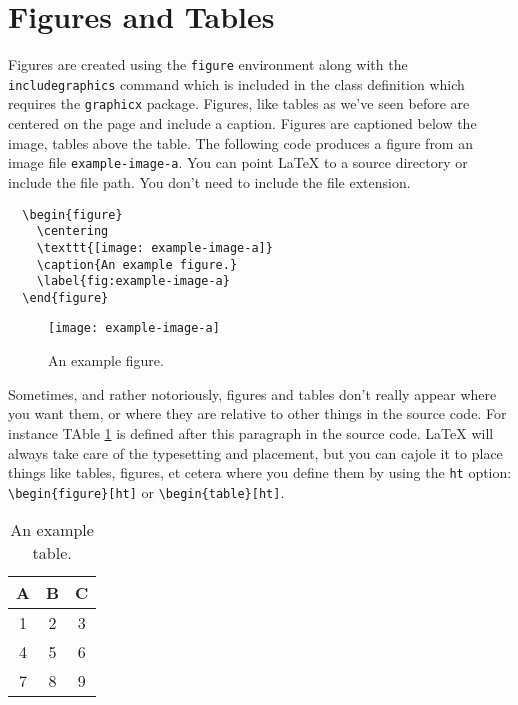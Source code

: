 \documentclass{thesis-dissertation}
\begin{document}
\section{Figures and Tables}
Figures are created using the \texttt{figure} environment along with the \texttt{includegraphics} command which is included in the class definition which requires the \texttt{graphicx} package. Figures, like tables as we've seen before are centered on the page and include a caption. Figures are captioned below the image, tables above the table. The following code produces a figure from an image file \texttt{example-image-a}. You can point \LaTeX{} to a source directory or include the file path. You don't need to include the file extension.
\begin{singlespace}
  \begin{verbatim}
  \begin{figure}
    \centering
    \texttt{[image: example-image-a]}
    \caption{An example figure.}
    \label{fig:example-image-a}
  \end{figure}
\end{verbatim}
\end{singlespace}

\begin{figure}[ht]
  \centering
  \texttt{[image: example-image-a]}
  \caption{An example figure.}
  \label{fig:example-image-a}
\end{figure}

Sometimes, and rather notoriously, figures and tables don't really appear where you want them, or where they are relative to other things in the source code. For instance TAble \ref{tab:example-table} is defined after this paragraph in the source code. \LaTeX{} will always take care of the typesetting and placement, but you can cajole it to place things like tables, figures, et cetera where you define them by using the \texttt{ht} option: \verb|\begin{figure}[ht]| or \verb|\begin{table}[ht]|.
 \begin{table}
  \centering
  \begin{tabular}{|c|c|c|} %
    \hline
    A & B & C \\
    \hline
    1 & 2 & 3 \\
    4 & 5 & 6 \\
    7 & 8 & 9 \\
    \hline
  \end{tabular}
  \caption{An example table.}
  \label{tab:example-table}
\end{table}
\end{document}
